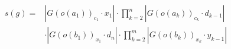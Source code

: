 \documentclass[preview]{standalone}
\begin{document}
\begin{align*}
s(g) = &\left\lvert G(o(a_1))_{c_1} \cdot x_1\right\rvert \cdot \prod_{k=2}^{n}\left\lvert G(o(a_{k}))_{c_{k}} \cdot d_{k-1}\right\rvert \\ &\cdot \left\lvert G(o(b_1))_{x_1} \cdot d_{n}\right\rvert \cdot \prod_{k=2}^{m}\left\lvert G(o(b_{k}))_{x_{k}} \cdot y_{k-1}\right\rvert
\end{align*}
\end{document}

